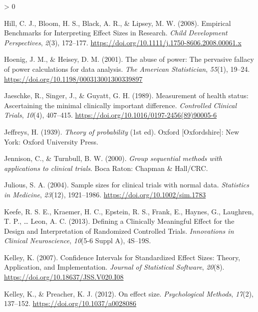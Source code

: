 \documentclass[
  english,
  ,jou, a4paper,floatsintext]{apa6}
\newlength{\cslhangindent}
\newenvironment{CSLReferences}[2] %
 {%
  \setlength{\parindent}{0pt}
  \ifodd #1 \everypar{\setlength{\hangindent}{\cslhangindent}}\ignorespaces\fi
  \ifnum #2 > 0
  \setlength{\parskip}{#2\baselineskip}
  \fi
 }%
 {}
\begin{document}
\begin{CSLReferences}{1}{0}
\leavevmode\hypertarget{ref-hill_empirical_2008}{}%
Hill, C. J., Bloom, H. S., Black, A. R., \& Lipsey, M. W. (2008). Empirical {Benchmarks} for {Interpreting Effect Sizes} in {Research}. \emph{Child Development Perspectives}, \emph{2}(3), 172--177. \url{https://doi.org/10.1111/j.1750-8606.2008.00061.x}

\leavevmode\hypertarget{ref-hoenig_abuse_2001}{}%
Hoenig, J. M., \& Heisey, D. M. (2001). The abuse of power: The pervasive fallacy of power calculations for data analysis. \emph{The American Statistician}, \emph{55}(1), 19--24. \url{https://doi.org/10.1198/000313001300339897}

\leavevmode\hypertarget{ref-jaeschke_measurement_1989}{}%
Jaeschke, R., Singer, J., \& Guyatt, G. H. (1989). Measurement of health status: Ascertaining the minimal clinically important difference. \emph{Controlled Clinical Trials}, \emph{10}(4), 407--415. \url{https://doi.org/10.1016/0197-2456(89)90005-6}

\leavevmode\hypertarget{ref-jeffreys_theory_1939}{}%
Jeffreys, H. (1939). \emph{Theory of probability} (1st ed). {Oxford {[}Oxfordshire{]}: New York}: {Oxford University Press}.

\leavevmode\hypertarget{ref-jennison_group_2000}{}%
Jennison, C., \& Turnbull, B. W. (2000). \emph{Group sequential methods with applications to clinical trials}. {Boca Raton}: {Chapman \& Hall/CRC}.

\leavevmode\hypertarget{ref-julious_sample_2004}{}%
Julious, S. A. (2004). Sample sizes for clinical trials with normal data. \emph{Statistics in Medicine}, \emph{23}(12), 1921--1986. \url{https://doi.org/10.1002/sim.1783}

\leavevmode\hypertarget{ref-keefe_defining_2013}{}%
Keefe, R. S. E., Kraemer, H. C., Epstein, R. S., Frank, E., Haynes, G., Laughren, T. P., \ldots{} Leon, A. C. (2013). Defining a {Clinically Meaningful Effect} for the {Design} and {Interpretation} of {Randomized Controlled Trials}. \emph{Innovations in Clinical Neuroscience}, \emph{10}(5-6 Suppl A), 4S--19S.

\leavevmode\hypertarget{ref-kelley_confidence_2007}{}%
Kelley, K. (2007). Confidence {Intervals} for {Standardized Effect Sizes}: Theory, {Application}, and {Implementation}. \emph{Journal of Statistical Software}, \emph{20}(8). \url{https://doi.org/10.18637/JSS.V020.I08}

\leavevmode\hypertarget{ref-kelley_effect_2012}{}%
Kelley, K., \& Preacher, K. J. (2012). On effect size. \emph{Psychological Methods}, \emph{17}(2), 137--152. \url{https://doi.org/10.1037/a0028086}


\end{CSLReferences}
\end{document}
